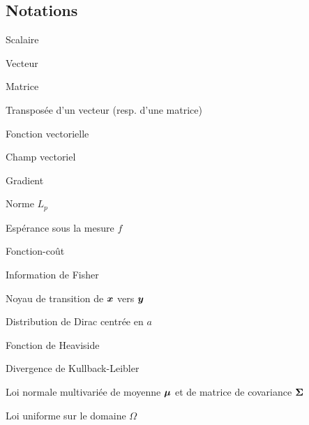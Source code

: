 \begin{description}[align=left,labelwidth=3cm,font=\normalfont]
\newpage
\thispagestyle{empty}


\subsection*{Notations}
\item [$x$] Scalaire
\item [$\Vecx$] Vecteur 
\item [$\bm{X}$] Matrice
\item [$\Vecx^T, \bm{X}^T$] Transposée d'un vecteur (resp. d'une matrice)
\item [$\vec{J}$] Fonction vectorielle
\item [$\vec{\Vecu}$] Champ vectoriel 

\item [$\nabla(\cdot)$] Gradient
\item [$||\cdot ||_p$] Norme $L_p$
\item [$\mathbb{E}_f(\cdot)$] Espérance sous la mesure $f$
\item [$\mathcal{J} (\cdot)$] Fonction-coût
\item [$\mathcal{I}(\cdot)$] Information de Fisher
\item [$\mathcal{K}(\Vecx, \Vecy)$] Noyau de transition de $\Vecx$ vers ${\bm{y}}$
\item [$\delta_a(x) = \delta(x-a)$] Distribution de Dirac centrée en $a$
\item [$H(\cdot)$] Fonction de Heaviside
\item [$D(\cdot || \cdot)$] Divergence de Kullback-Leibler

\item [$\mathcal{N}(\cdot | \VecMu, \MatSigma$)] Loi normale multivariée de moyenne ${\bm{\mu}}$ et de matrice de covariance ${\bm{\Sigma}}$
\item [$\mathcal{U}_\Omega(\cdot)$] Loi uniforme sur le domaine $\Omega$





\end{description}